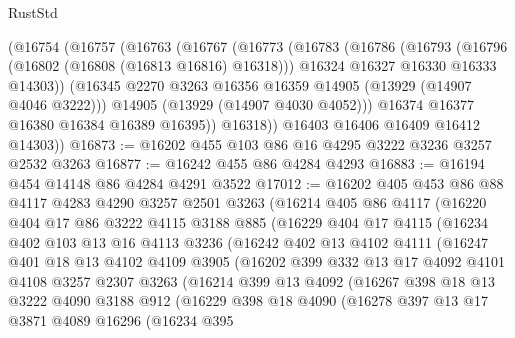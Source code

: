 \begin{lexlean}{RustStd}
\begin{coremodule}
{\begin{coremodule}
{{{{{{{{{{{{{{{{{{{{{{{{{{{{{{{{{{{{{      (@16754
        (@16757
          (@16763
            (@16767
              (@16773
                (@16783
                  (@16786
                    (@16793
                      (@16796 (@16802 (@16808 (@16813 @16816) @16318)))
                      @16324
                      @16327
                      @16330
                      @16333
                      @14303))
                  (@16345 @2270 @3263 @16356 @16359 @14905 (@13929 (@14907 @4046 @3222)))
                  @14905
                  (@13929 (@14907 @4030 @4052)))
                @16374
                @16377
                @16380
                @16384
                @16389
                @16395))
            @16318))
        @16403
        @16406
        @16409
        @16412
        @14303))
@16873 := @16202 @455 @103 @86 @16 @4295 @3222 @3236 @3257 @2532 @3263
@16877 := @16242 @455 @86 @4284 @4293
@16883 := @16194 @454 @14148 @86 @4284 @4291 @3522
@17012 := @16202
    @405
    @453
    @86
    @88
    @4117
    @4283
    @4290
    @3257
    @2501
    @3263
    (@16214
      @405
      @86
      @4117
      (@16220
        @404
        @17
        @86
        @3222
        @4115
        @3188
        @885
        (@16229
          @404
          @17
          @4115
          (@16234
            @402
            @103
            @13
            @16
            @4113
            @3236
            (@16242
              @402
              @13
              @4102
              @4111
              (@16247
                @401
                @18
                @13
                @4102
                @4109
                @3905
                (@16202
                  @399
                  @332
                  @13
                  @17
                  @4092
                  @4101
                  @4108
                  @3257
                  @2307
                  @3263
                  (@16214
                    @399
                    @13
                    @4092
                    (@16267
                      @398
                      @18
                      @13
                      @3222
                      @4090
                      @3188
                      @912
                      (@16229
                        @398
                        @18
                        @4090
                        (@16278
                          @397
                          @13
                          @17
                          @3871
                          @4089
                          @16296
                          (@16234
                            @395
}}}}}}}}}}}}}}}}}}}}}}}}}}}}}}}}}}}}}
\end{coremodule}}
\end{coremodule}
\end{lexlean}
